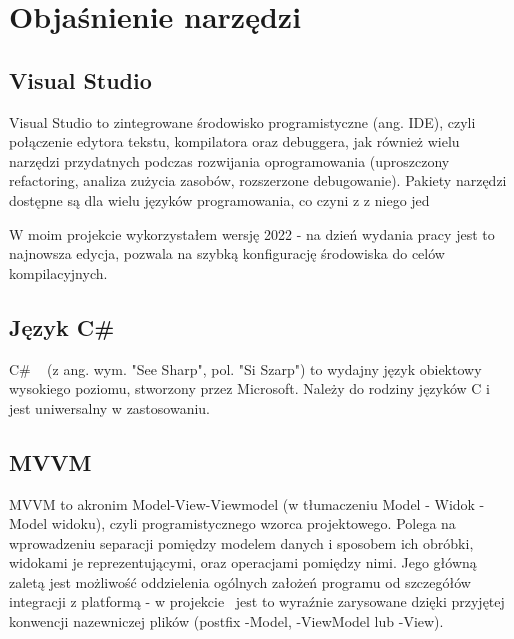 \section{Objaśnienie narzędzi}

\subsection{Visual Studio}

Visual Studio \cite{visualStudio} to zintegrowane środowisko programistyczne (ang. IDE), 
czyli połączenie edytora tekstu, kompilatora oraz debuggera, jak również wielu narzędzi przydatnych podczas rozwijania oprogramowania
(uproszczony refactoring, analiza zużycia zasobów, rozszerzone debugowanie). Pakiety narzędzi dostępne są dla wielu
języków programowania, co czyni z z niego jed

W moim projekcie wykorzystałem wersję 2022 - na dzień wydania pracy jest to najnowsza edycja,
pozwala na szybką konfigurację środowiska do celów kompilacyjnych.


\subsection{Język C\#}

C\# ~\cite{csharpDocs} (z ang. wym. "See Sharp", pol. "Si Szarp") to wydajny język obiektowy wysokiego poziomu, 
stworzony przez Microsoft.
Należy do rodziny języków C i jest uniwersalny w zastosowaniu.

\subsection{MVVM}
MVVM to akronim Model-View-Viewmodel (w tłumaczeniu Model - Widok - Model widoku), czyli programistycznego wzorca projektowego.
Polega na wprowadzeniu separacji pomiędzy modelem danych i sposobem ich obróbki, widokami je reprezentującymi, oraz operacjami pomiędzy nimi. 
Jego główną zaletą jest możliwość oddzielenia ogólnych założeń programu od szczegółów integracji z platformą 
- w projekcie~\cite{Halaczkiewicz_SMCEBI_Navigator_GitHub} jest to wyraźnie zarysowane dzięki przyjętej 
konwencji nazewniczej plików (postfix -Model, -ViewModel lub -View).

\begin{center}
\end{center}

